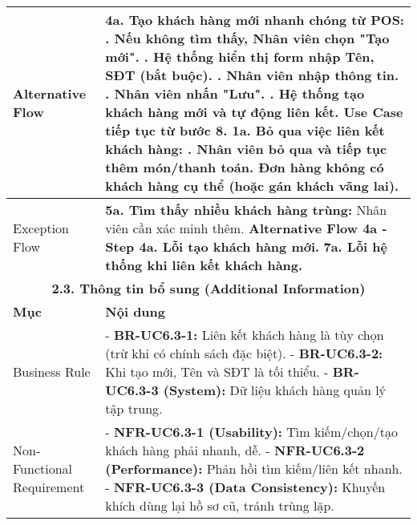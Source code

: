 \begin{longtable}{|m{4cm}|p{11cm}|}
\hline
Alternative Flow & \textbf{4a. Tạo khách hàng mới nhanh chóng từ POS:} \newline    1. Nếu không tìm thấy, Nhân viên chọn "Tạo mới". \newline    2. Hệ thống hiển thị form nhập Tên, SĐT (bắt buộc). \newline    3. Nhân viên nhập thông tin. \newline    4. Nhân viên nhấn "Lưu". \newline    5. Hệ thống tạo khách hàng mới và tự động liên kết. Use Case tiếp tục từ bước 8. \newline \textbf{1a. Bỏ qua việc liên kết khách hàng:} \newline    1. Nhân viên bỏ qua và tiếp tục thêm món/thanh toán. Đơn hàng không có khách hàng cụ thể (hoặc gán khách vãng lai). \\
\hline
Exception Flow & \textbf{5a. Tìm thấy nhiều khách hàng trùng:} Nhân viên cần xác minh thêm. \newline \textbf{Alternative Flow 4a - Step 4a. Lỗi tạo khách hàng mới.} \newline \textbf{7a. Lỗi hệ thống khi liên kết khách hàng.} \\
\hline
\multicolumn{2}{|c|}{\textbf{2.3. Thông tin bổ sung (Additional Information)}} \\
\hline
\textbf{Mục} & \textbf{Nội dung} \\
\hline
Business Rule & - \textbf{BR-UC6.3-1:} Liên kết khách hàng là tùy chọn (trừ khi có chính sách đặc biệt). \newline - \textbf{BR-UC6.3-2:} Khi tạo mới, Tên và SĐT là tối thiểu. \newline - \textbf{BR-UC6.3-3 (System):} Dữ liệu khách hàng quản lý tập trung. \\
\hline
Non-Functional Requirement & - \textbf{NFR-UC6.3-1 (Usability):} Tìm kiếm/chọn/tạo khách hàng phải nhanh, dễ. \newline - \textbf{NFR-UC6.3-2 (Performance):} Phản hồi tìm kiếm/liên kết nhanh. \newline - \textbf{NFR-UC6.3-3 (Data Consistency):} Khuyến khích dùng lại hồ sơ cũ, tránh trùng lặp. \\
\hline
\end{longtable}

